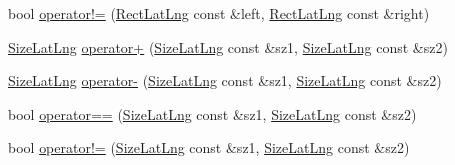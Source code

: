 \begin{DoxyCompactItemize}
\item 
bool \hyperlink{group___o_p_map_widget_ga8957984d0dfe65bb3042d9fd7f36f043}{operator!=} (\hyperlink{structinternals_1_1_rect_lat_lng}{\-Rect\-Lat\-Lng} const \&left, \hyperlink{structinternals_1_1_rect_lat_lng}{\-Rect\-Lat\-Lng} const \&right)
\item 
\hyperlink{structinternals_1_1_size_lat_lng}{\-Size\-Lat\-Lng} \hyperlink{group___o_p_map_widget_ga40db61334553eb3b32aee299116e616a}{operator+} (\hyperlink{structinternals_1_1_size_lat_lng}{\-Size\-Lat\-Lng} const \&sz1, \hyperlink{structinternals_1_1_size_lat_lng}{\-Size\-Lat\-Lng} const \&sz2)
\item 
\hyperlink{structinternals_1_1_size_lat_lng}{\-Size\-Lat\-Lng} \hyperlink{group___o_p_map_widget_gab6ce9f24cd5044e4c558c513bdb96efc}{operator-\/} (\hyperlink{structinternals_1_1_size_lat_lng}{\-Size\-Lat\-Lng} const \&sz1, \hyperlink{structinternals_1_1_size_lat_lng}{\-Size\-Lat\-Lng} const \&sz2)
\item 
bool \hyperlink{group___o_p_map_widget_gad24bfed7e42c2af0ee0f764c6cc34611}{operator==} (\hyperlink{structinternals_1_1_size_lat_lng}{\-Size\-Lat\-Lng} const \&sz1, \hyperlink{structinternals_1_1_size_lat_lng}{\-Size\-Lat\-Lng} const \&sz2)
\item 
bool \hyperlink{group___o_p_map_widget_gaa65f8008332c3773a009a9d307330a5d}{operator!=} (\hyperlink{structinternals_1_1_size_lat_lng}{\-Size\-Lat\-Lng} const \&sz1, \hyperlink{structinternals_1_1_size_lat_lng}{\-Size\-Lat\-Lng} const \&sz2)
\end{DoxyCompactItemize}
